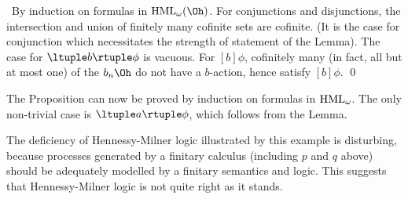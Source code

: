 \proof\ By induction on formulas in  ${\rm HML}_{\omega}(\Oh )$. 
For conjunctions and disjunctions, the intersection and union of finitely many cofinite sets are cofinite. 
(It is the case for conjunction which necessitates the strength of statement of the Lemma).
The case for ${\ltuple b \rtuple}\phi$ is vacuous. 
For ${[b]}\phi$, cofinitely many (in fact, all but at most one) of the $b_{n}\Oh$ do not have a $b$-action, hence satisfy ${[b]}\phi$. \qed

The Proposition can now be proved by induction on formulas in ${\rm HML}_{\omega}$. 
The only non-trivial case is ${\ltuple a \rtuple}\phi$, which follows from the Lemma.

The deficiency of Hennessy-Milner logic illustrated by this example is disturbing, 
because processes generated by a finitary calculus (including $p$ and $q$ above) should be adequately modelled by a finitary semantics and logic. 
This suggests that Hennessy-Milner logic is not quite right as it stands.

